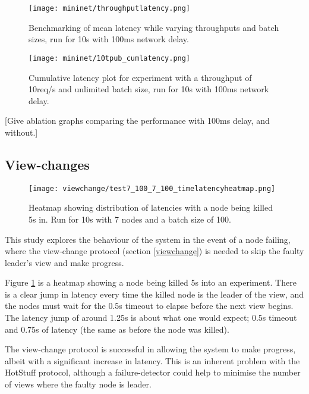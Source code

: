 \begin{figure}[h!]
\centering
\texttt{[image: mininet/throughputlatency.png]}
\caption{Benchmarking of mean latency while varying throughputs and batch sizes, run for 10s with 100ms network delay.}
\end{figure}

\begin{figure}[h!]
\centering
\texttt{[image: mininet/10tpub\_cumlatency.png]}
\caption{Cumulative latency plot for experiment with a throughput of 10req/s and unlimited batch size, run for 10s with 100ms network delay.}
\end{figure}

[Give ablation graphs comparing the performance with 100ms delay, and without.]

\subsection{View-changes} \label{viewchangeeval}

\begin{figure}[h!]
\centering
\texttt{[image: viewchange/test7\_100\_7\_100\_timelatencyheatmap.png]}
\caption{Heatmap showing distribution of latencies with a node being killed 5s in. Run for 10s with 7 nodes and a batch size of 100.}
\label{viewchangeheatmap}
\end{figure}

This study explores the behaviour of the system in the event of a node failing, where the view-change protocol (section \ref{viewchange}) is needed to skip the faulty leader's view and make progress.

Figure \ref{viewchangeheatmap} is a heatmap showing a node being killed 5s into an experiment. There is a clear jump in latency every time the killed node is the leader of the view, and the nodes must wait for the 0.5s timeout to elapse before the next view begins. The latency jump of around 1.25s is about what one would expect; 0.5s timeout and 0.75s of latency (the same as before the node was killed).

The view-change protocol is successful in allowing the system to make progress, albeit with a significant increase in latency. This is an inherent problem with the HotStuff protocol, although a failure-detector could help to minimise the number of views where the faulty node is leader.



